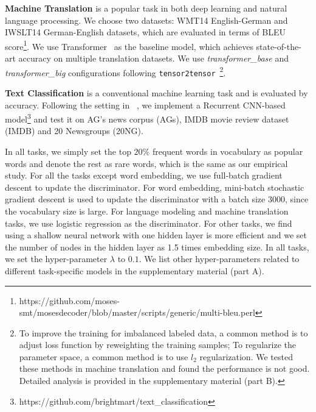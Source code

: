 \documentclass{article}
\begin{document}
\textbf{Machine Translation} is a popular task in both deep learning and natural language processing. We choose two datasets: WMT14 English-German and IWSLT14 German-English datasets, which are evaluated in terms of BLEU score\footnote{https://github.com/moses-smt/mosesdecoder/blob/master/scripts/generic/multi-bleu.perl}. We use Transformer~\cite{vaswani2017attention} as the baseline model, which achieves state-of-the-art accuracy on multiple translation datasets. We use \emph{transformer\_base} and \emph{transformer\_big} configurations following \texttt{tensor2tensor}~\cite{DBLP:journals/corr/abs-1803-07416}\footnote{To improve the training for imbalanced labeled data, a common method is to adjust loss function by reweighting the training samples; To regularize the parameter space, a common method is to use $l_2$ regularization. We tested these methods in machine translation and found the performance is not good. Detailed analysis is provided in the supplementary material (part B).}.

\textbf{Text Classification} is a conventional machine learning task and is evaluated by accuracy. Following the setting in ~\cite{lai2015recurrent}, we implement a Recurrent CNN-based model\footnote{https://github.com/brightmart/text\_classification} and test it on AG's news corpus (AGs), IMDB movie review dataset (IMDB) and 20 Newsgroups (20NG). 

In all tasks, we simply set the top $20\%$ frequent words in vocabulary as popular words and denote the rest as rare words, which is the same as our empirical study. For all the tasks except word embedding, we use full-batch gradient descent to update the discriminator. For word embedding, mini-batch stochastic gradient descent is used to update the discriminator with a batch size 3000, since the vocabulary size is large. For language modeling and machine translation tasks, we use logistic regression as the discriminator. For other tasks, we find using a shallow neural network with one hidden layer is more efficient and we set the number of nodes in the hidden layer as 1.5 times embedding size. In all tasks, we set the hyper-parameter $\lambda$ to $0.1$. We list other hyper-parameters related to different task-specific models in the supplementary material (part A).
\end{document}
